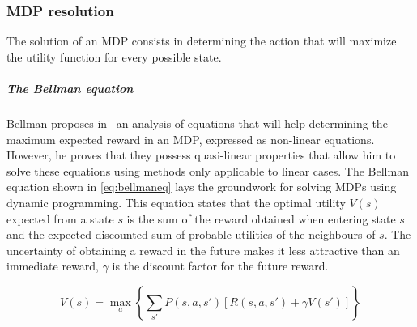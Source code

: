 \subsubsection{MDP resolution}
The solution of an MDP consists in determining the action that will maximize the utility function for every possible state.

\subparagraph{The Bellman equation}
Bellman proposes in~\cite{bellman1957} an analysis of equations that will help determining the maximum expected reward in an MDP, expressed as non-linear equations. However, he proves that they possess quasi-linear properties that allow him to solve these equations using methods only applicable to linear cases. 
The Bellman equation shown in \eqref{eq:bellmaneq} lays the groundwork for solving MDPs using dynamic programming.
This equation states that the optimal utility $V(s)$ expected from a state $s$ is the sum of the reward obtained when entering state $s$ and the expected discounted sum of probable utilities of the neighbours of $s$. The uncertainty of obtaining a reward in the future makes it less attractive than an immediate reward, $\gamma$ is the discount factor for the future reward.

\begin{equation}
V(s) = \max\limits_a \left \{\sum\limits_{s'}P(s,a,s')[R(s,a,s') + \gamma    V(s')  ] \right \}
\label{eq:bellmaneq}
\end{equation}






